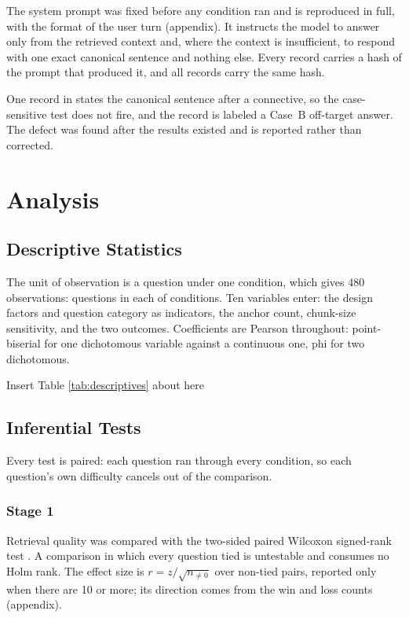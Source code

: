 The system prompt was fixed before any condition ran and is reproduced in full,
with the format of the user turn (appendix). It
instructs the model to answer only from the retrieved context and, where the
context is insufficient, to respond with one exact canonical sentence and
nothing else. Every record carries a hash of the prompt that produced it, and
all \thesisQeightNumRecords{} records carry the same hash.

One record in \thesisQeightNumRecords{} states the canonical sentence after a
connective, so the case-sensitive test does not fire, and the record is labeled
a Case~B off-target answer. The defect was found after the results existed and
is reported rather than corrected.

\section{Analysis}

\subsection{Descriptive Statistics}

The unit of observation is a question under one condition, which gives 480
observations: \thesisNumQuestionsScored{} questions in each of
\thesisNumConditions{} conditions. Ten variables enter: the design factors and
question category as indicators, the anchor count, chunk-size sensitivity, and
the two outcomes. Coefficients are Pearson throughout: point-biserial for one
dichotomous variable against a continuous one, phi for two dichotomous.

{\centering\noindent Insert Table \ref{tab:descriptives} about here\par}

\subsection{Inferential Tests}

Every test is paired: each question ran through every condition, so each
question's own difficulty cancels out of the comparison.

\subsubsection{Stage 1}

Retrieval quality was compared with the two-sided paired Wilcoxon signed-rank
test \parencite{wilcoxon1945}. A comparison in which every question tied is
untestable and consumes no Holm rank. The effect size is
$r = z / \sqrt{n_{\neq 0}}$ over non-tied pairs, reported only when there are
10 or more; its direction comes from the win and loss counts (appendix).

